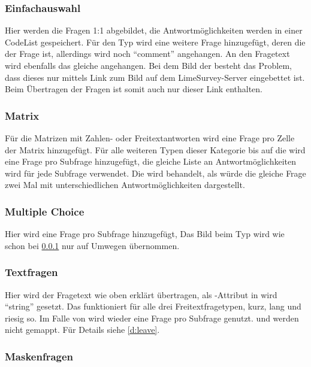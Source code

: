 \subsubsection{Einfachauswahl}
\label{e:sc}

Hier werden die Fragen 1:1 abgebildet, die Antwortmöglichkeiten werden in einer CodeList gespeichert.
Für den Typ  wird eine weitere Frage hinzugefügt, deren  die  der Frage ist, allerdings wird noch \enquote{comment} angehangen.
An den Fragetext wird ebenfalls das gleiche angehangen.
Bei dem Bild der  besteht das Problem, dass dieses nur mittels Link zum Bild auf dem LimeSurvey-Server eingebettet ist.
Beim Übertragen der Fragen ist somit auch nur dieser Link enthalten.

\subsubsection{Matrix}

Für die Matrizen mit Zahlen- oder Freitextantworten wird eine Frage pro Zelle der Matrix hinzugefügt.
Für alle weiteren Typen dieser Kategorie bis auf die  wird eine Frage pro Subfrage hinzugefügt, die gleiche Liste an Antwortmöglichkeiten wird für jede Subfrage verwendet.
Die  wird behandelt, als würde die gleiche Frage zwei Mal mit unterschiedlichen Antwortmöglichkeiten dargestellt.

\subsubsection{Multiple Choice}

Hier wird eine Frage pro Subfrage hinzugefügt, %
Das Bild beim Typ  wird wie schon bei \cref{e:sc} nur auf Umwegen übernommen.

\subsubsection{Textfragen}

Hier wird der Fragetext wie oben erklärt übertragen, als -Attribut in  wird \enquote{string} gesetzt.
Das funktioniert für alle drei Freitextfragetypen, kurz, lang und riesig so.
Im Falle von  wird wieder eine Frage pro Subfrage genutzt.
 und  werden nicht gemappt. Für Details siehe \cref{d:leave}.

\subsubsection{Maskenfragen}

